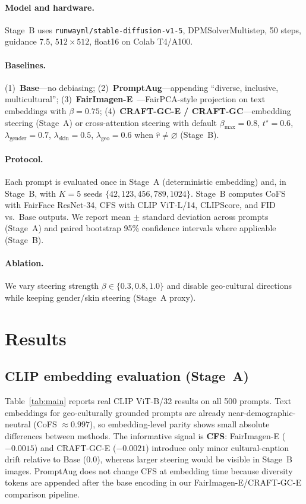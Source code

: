 \documentclass[11pt,a4paper]{article}
\begin{document}
\paragraph{Model and hardware.}
Stage~B uses \texttt{runwayml/stable-diffusion-v1-5}, DPMSolverMultistep, 50 steps, guidance 7.5, $512\times512$, float16 on Colab T4/A100.

\paragraph{Baselines.}
(1)~\textbf{Base}---no debiasing;
(2)~\textbf{PromptAug}---appending ``diverse, inclusive, multicultural'';
(3)~\textbf{FairImagen-E}~\cite{fu2025fairimagen}---FairPCA-style projection on text embeddings with $\beta=0.75$;
(4)~\textbf{CRAFT-GC-E / CRAFT-GC}---embedding steering (Stage~A) or cross-attention steering with default $\beta_{\max}=0.8$, $t^\star=0.6$, $\lambda_{\mathrm{gender}}=0.7$, $\lambda_{\mathrm{skin}}=0.5$, $\lambda_{\mathrm{geo}}=0.6$ when $\hat{r}\neq\varnothing$ (Stage~B).

\paragraph{Protocol.}
Each prompt is evaluated once in Stage~A (deterministic embedding) and, in Stage~B, with $K=5$ seeds $\{42,123,456,789,1024\}$. Stage~B computes CoFS with FairFace ResNet-34, CFS with CLIP ViT-L/14, CLIPScore, and FID vs.\ Base outputs. We report mean $\pm$ standard deviation across prompts (Stage~A) and paired bootstrap 95\% confidence intervals where applicable (Stage~B).

\paragraph{Ablation.}
We vary steering strength $\beta \in \{0.3,0.8,1.0\}$ and disable geo-cultural directions while keeping gender/skin steering (Stage~A proxy).

\section{Results}
\label{sec:results}

\subsection{CLIP embedding evaluation (Stage~A)}

Table~\ref{tab:main} reports real CLIP ViT-B/32 results on all 500 prompts. Text embeddings for geo-culturally grounded prompts are already near-demographic-neutral (CoFS $\approx 0.997$), so embedding-level parity shows small absolute differences between methods. The informative signal is \textbf{CFS}: FairImagen-E ($-0.0015$) and CRAFT-GC-E ($-0.0021$) introduce only minor cultural-caption drift relative to Base ($0.0$), whereas larger steering would be visible in Stage~B images. PromptAug does not change CFS at embedding time because diversity tokens are appended after the base encoding in our FairImagen-E/CRAFT-GC-E comparison pipeline.
\end{document}
